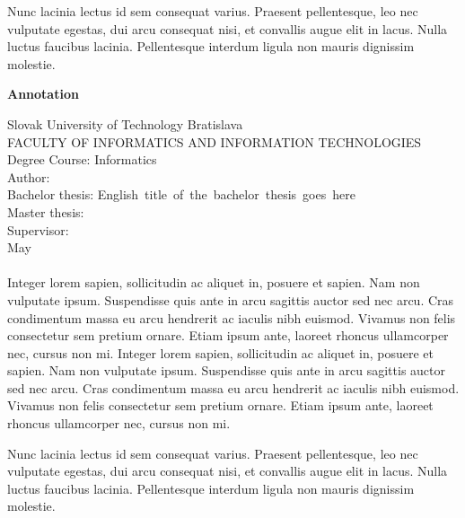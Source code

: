 Nunc lacinia lectus id sem consequat varius. Praesent pellentesque, leo nec vulputate egestas, dui arcu consequat nisi, et convallis augue elit in lacus. Nulla luctus faucibus lacinia. Pellentesque interdum ligula non mauris dignissim molestie.\newpage
\thispagestyle{plain}
\begin{center}
\begin{Large}
\textbf{Annotation} \\
\end{Large}
\end{center}
Slovak University of Technology Bratislava \\
FACULTY OF INFORMATICS AND INFORMATION TECHNOLOGIES \\
\noindent
Degree Course: Informatics \\
\noindent
Author: \Author \\
{
	{Bachelor thesis: }\mbox{English title of the bachelor thesis goes here}\\
}
{
	{Master thesis: }\Title \\
}
Supervisor: \Supervisor \\
May \Year \\
\noindent
\\
Integer lorem sapien, sollicitudin ac aliquet in, posuere et sapien. Nam non vulputate ipsum. Suspendisse quis ante in arcu sagittis auctor sed nec arcu. Cras condimentum massa eu arcu hendrerit ac iaculis nibh euismod. Vivamus non felis consectetur sem pretium ornare. Etiam ipsum ante, laoreet rhoncus ullamcorper nec, cursus non mi. Integer lorem sapien, sollicitudin ac aliquet in, posuere et sapien. Nam non vulputate ipsum. Suspendisse quis ante in arcu sagittis auctor sed nec arcu. Cras condimentum massa eu arcu hendrerit ac iaculis nibh euismod. Vivamus non felis consectetur sem pretium ornare. Etiam ipsum ante, laoreet rhoncus ullamcorper nec, cursus non mi.

Nunc lacinia lectus id sem consequat varius. Praesent pellentesque, leo nec vulputate egestas, dui arcu consequat nisi, et convallis augue elit in lacus. Nulla luctus faucibus lacinia. Pellentesque interdum ligula non mauris dignissim molestie.
